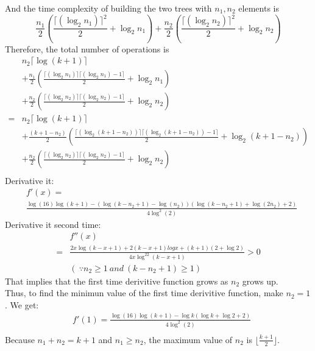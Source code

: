 \documentclass[fleqn,a4paper,12pt]{article}
\begin{document}
\begin{enumerate}
\begin{itemize}
      And the time complexity of building the two trees with $n_1, n_2$ elements is 
      \[ \frac{n_1}{2} ( \frac{ \lceil (\log_2 n_1) \rceil^2 }{2} + \log_2 n_1 ) + \frac{n_2}{2} ( \frac{ \lceil (\log_2 n_2) \rceil^2 }{2} + \log_2 n_2 )\]
      Therefore, the total number of operations is 
      \begin{align*}
       & n_2 \lceil \log (k+1) \rceil \\
       & + \frac{n_1}{2} ( \frac{ \lceil (\log_2 n_1) \rceil \lceil (\log_2 n_1) - 1 \rceil }{2} + \log_2 n_1 ) \\
       & + \frac{n_2}{2} ( \frac{ \lceil (\log_2 n_2) \rceil \lceil (\log_2 n_2) - 1 \rceil }{2} + \log_2 n_2 )\\
        =&n_2 \lceil \log (k+1) \rceil  \\
      & + \frac{(k+1-n_2)}{2} ( \frac{ \lceil (\log_2 (k+1-n_2)) \rceil \lceil (\log_2 (k+1-n_2)) - 1 \rceil  }{2} + \log_2 (k+1-n_2) ) \\
        & + \frac{n_2}{2} ( \frac{ \lceil (\log_2 n_2) \rceil \lceil (\log_2 n_2) -1  \rceil }{2} + \log_2 n_2 )
      \end{align*}
      \begin{align*}
      \end{align*}
      Derivative it:
     \begin{align*}
       &f'(x) = \\
       &\frac { \log(16) \log(k+1)-( \log(k-n_2+1)- \log(n_2)) ( \log(k-n_2+1)+ \log(2 n_2)+2) }{ 4 \log^2(2) }
     \end{align*}
     Derivative it second time:
     \begin{align*}
       &f''(x)\\
       =&\frac {2 x \log (k-x+1) +2 (k-x+1) log x+(k+1) (2+ \log 2)}{4 x \log^22 (k-x+1)} > 0 \\
       &( \ \because n_2 \geq 1\  and\  (k-n_2+1) \geq 1 )
     \end{align*}
     That implies that the first time derivitive function grows as $n_2$ grows up.\\
     Thus, to find the minimun value of the first time derivitive function, make $ n_2 = 1 $. We get:
     \begin{align*}
       &f'(1) = \frac{ \log(16) \log(k+1)- \log k (\log k + \log 2 + 2 )}{4 \log^2(2)} \\
     \end{align*}
     Because $n_1+n_2=k+1$ and $n_1 \geq  n_2$, the maximum value of $n_2$ is $ \lfloor \frac{k+1}{2} \rfloor $.\\

\end{itemize}
\end{enumerate}
\end{document}
